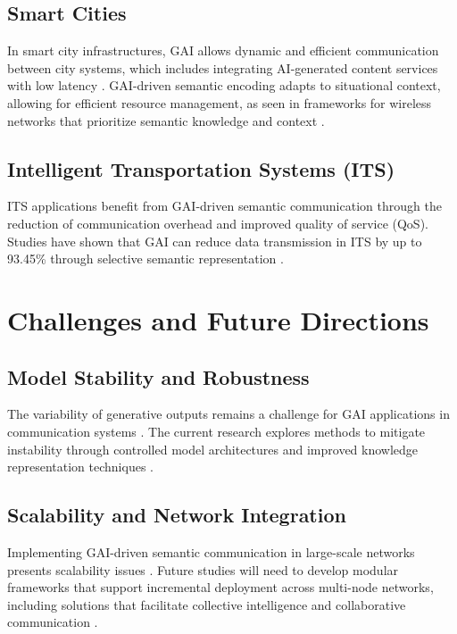 \documentclass[journal,transmag]{IEEEtran}
\begin{document}
\subsection{Smart Cities}
In smart city infrastructures, GAI allows dynamic and efficient communication between city systems, which includes integrating AI-generated content services with low latency \cite{10614204}. GAI-driven semantic encoding adapts to situational context, allowing for efficient resource management, as seen in frameworks for wireless networks that prioritize semantic knowledge and context \cite{bariah2023largegenerativeaimodels}.

\subsection{Intelligent Transportation Systems (ITS)}
ITS applications benefit from GAI-driven semantic communication through the reduction of communication overhead and improved quality of service (QoS). Studies have shown that GAI can reduce data transmission in ITS by up to 93.45\% through selective semantic representation \cite{10634888,raha2023generativeaidrivensemanticcommunication}.

\section{Challenges and Future Directions}

\subsection{Model Stability and Robustness}
The variability of generative outputs remains a challenge for GAI applications in communication systems \cite{10447237}. The current research explores methods to mitigate instability through controlled model architectures and improved knowledge representation techniques \cite{Thomas2023CausalRC}.

\subsection{Scalability and Network Integration}
Implementing GAI-driven semantic communication in large-scale networks presents scalability issues \cite{jiang2024largeaimodelbasedsemantic}. Future studies will need to develop modular frameworks that support incremental deployment across multi-node networks, including solutions that facilitate collective intelligence and collaborative communication \cite{10634888}.
\end{document}
